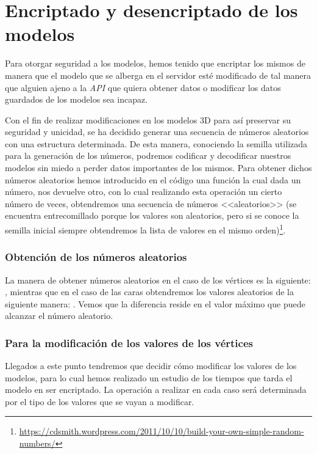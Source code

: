 \section{Encriptado y desencriptado de los modelos}
Para otorgar seguridad a los modelos, hemos tenido que encriptar los mismos de manera que el modelo que se alberga en el servidor esté modificado de tal manera que alguien ajeno a la \textit{API} que quiera obtener datos o modificar los datos guardados de los modelos sea incapaz.

Con el fin de realizar modificaciones en los modelos 3D para así preservar su seguridad y unicidad, se ha decidido generar una secuencia de números aleatorios con una estructura determinada. De esta manera, conociendo la semilla utilizada para la generación de los números, podremos codificar y decodificar nuestros modelos sin miedo a perder datos importantes de los mismos. Para obtener dichos números aleatorios hemos introducido en el código una función la cual dada un número, nos devuelve otro, con lo cual realizando esta operación un cierto número de veces, obtendremos una secuencia de números <<aleatorios>> (se encuentra entrecomillado porque los valores son aleatorios, pero si se conoce la semilla inicial siempre obtendremos la lista de valores en el mismo orden)\footnote{\url{https://cdsmith.wordpress.com/2011/10/10/build-your-own-simple-random-numbers/}}.

\subsubsection{Obtención de los números aleatorios}\label{sec:numero-aleatorio}
La manera de obtener números aleatorios en el caso de los vértices es la siguiente: , mientras que en el caso de las caras obtendremos los valores aleatorios de la siguiente manera: . Vemos que la diferencia reside en el valor máximo que puede alcanzar el número aleatorio.

\subsubsection{Para la modificación de los valores de los vértices}
Llegados a este punto tendremos que decidir cómo modificar los valores de los modelos, para lo cual hemos realizado un estudio de los tiempos que tarda el modelo en ser encriptado. La operación a realizar en cada caso será determinada por el tipo de los valores que se vayan a modificar.

